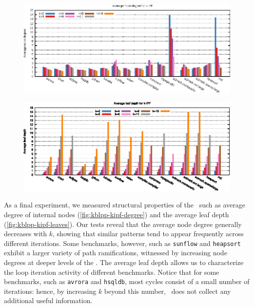 \ifdefined\noauthorea
\begin{figure}[!ht]
\begin{center}
\includegraphics[width=\textwidth]{figures/kblpp-kipf-degree/kblpp-kipf-degree.eps}
\caption{\protect}
\end{center}
\end{figure}
\fi

\ifdefined\noauthorea
\begin{figure}[!ht]
\begin{center}
\includegraphics[width=\textwidth]{figures/kblpp-kipf-leaves/kblpp-kipf-leaves.eps}
\caption{\protect}
\end{center}
\end{figure}
\fi

\noindent As a final experiment, we measured structural properties of the \kipf\ such as average degree of internal nodes (\myfigure\ref{fig:kblpp-kipf-degree}) and the average leaf depth (\myfigure\ref{fig:kblpp-kipf-leaves}). Our tests reveal that the average node degree generally decreases with $k$, showing that similar patterns tend to appear frequently across different iterations. Some benchmarks, however, such as {\tt sunflow} and {\tt heapsort} exhibit a larger variety of path ramifications, witnessed by increasing node degrees at deeper levels of the \kipf. The average leaf depth allows us to characterize the loop iteration activity of different benchmarks. Notice that for some benchmarks, such as {\tt avrora} and {\tt hsqldb}, most cycles consist of a small number of iterations: hence, by increasing $k$ beyond this number, \kblpp\ does not collect any additional useful information.